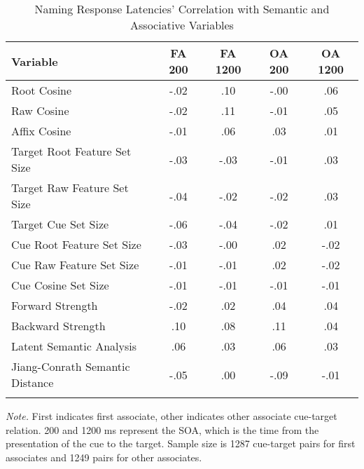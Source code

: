 \documentclass[english,,man]{apa6}
\theoremstyle{definition}
\theoremstyle{definition}
\theoremstyle{definition}
\theoremstyle{remark}
\begin{document}
\begin{table}[tbp]
\begin{center}
\begin{threeparttable}
\caption{\label{tab:name-table}Naming Response Latencies' Correlation with Semantic and Associative Variables}
\begin{tabular}{lcccc}
\toprule
Variable & \multicolumn{1}{c}{FA 200} & \multicolumn{1}{c}{FA 1200} & \multicolumn{1}{c}{OA 200} & \multicolumn{1}{c}{OA 1200}\\
\midrule
Root Cosine & -.02 & .10 & -.00 & .06\\
Raw Cosine & -.02 & .11 & -.01 & .05\\
Affix Cosine & -.01 & .06 & .03 & .01\\
Target Root Feature Set Size & -.03 & -.03 & -.01 & .03\\
Target Raw Feature Set Size & -.04 & -.02 & -.02 & .03\\
Target Cue Set Size & -.06 & -.04 & -.02 & .01\\
Cue Root Feature Set Size & -.03 & -.00 & .02 & -.02\\
Cue Raw Feature Set Size & -.01 & -.01 & .02 & -.02\\
Cue Cosine Set Size & -.01 & -.01 & -.01 & -.01\\
Forward Strength & -.02 & .02 & .04 & .04\\
Backward Strength & .10 & .08 & .11 & .04\\
Latent Semantic Analysis & .06 & .03 & .06 & .03\\
Jiang-Conrath Semantic Distance & -.05 & .00 & -.09 & -.01\\
\bottomrule
\addlinespace
\end{tabular}
\begin{tablenotes}[para]
\normalsize{\textit{Note.} First indicates first associate, other indicates other associate cue-target relation. 200 and 1200 ms represent the SOA, which is the time from the presentation of the cue to the target. Sample size is 1287 cue-target pairs for first associates and 1249 pairs for other associates.}
\end{tablenotes}
\end{threeparttable}
\end{center}
\end{table}
\end{document}
